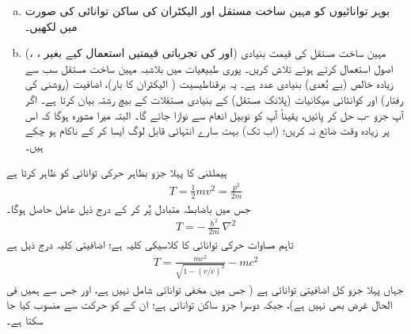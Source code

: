 \begin{enumerate}[a.]
\item
بوہر توانائیوں کو مہین ساخت مستقل اور الیکٹران کی ساکن توانائی  کی صورت میں لکھیں۔
\item
(، ،  اور  کی تجرباتی قیمتیں استعمال کیے بغیر) مہین ساخت مستقل کی قیمت بنیادی اصول استعمال کرتے ہوئے تلاش کریں۔ پوری طبیعیات میں بلاشبہ مہین ساخت مستقل سب سے زیادہ خالص (بے بُعدی) بنیادی عدد ہے۔ یہ برقناطیسیت ( الیکٹران کا بار)، اضافیت (روشنی کی رفتار) اور کوانٹائی میکانیات (پلانک مستقل) کے بنیادی مستقلات کے بیچ رشتہ بیان کرتا ہے۔ اگر آپ جزو -ب حل کر پائیں، یقیناً آپ کو نوبیل انعام سے نوازا جائے گا۔ البتہ میرا مشورہ ہوگا کہ اس پر زیادہ وقت ضائع نہ کریں؛ (اب تک) بہت سارے انتہائی قابل لوگ ایسا کر کے ناکام ہو چکے ہیں۔ 
\end{enumerate}

ہیملٹنی کا پہلا جزو بظاہر حرکی توانائی کو ظاہر کرتا ہے 
\begin{align}\label{مساوات_غیر_مضطرب_حرکی_توانائی}
T = \frac{1}{2} mv^2 = \frac{p^2}{2m} 
\end{align}
جس میں باضابطہ متبادل  پُر کر کے درج ذیل عامل حاصل ہوگا۔
\begin{align}
T = - \frac{\hslash^2}{2m} \nabla^2
\end{align} 
تاہم مساوات  حرکی توانائی کا کلاسیکی کلیہ ہے؛ اضافیتی کلیہ درج ذیل ہے
\begin{align}
T = \frac{mc^2}{\sqrt{1 - (v/c)^2}} - mc^2
\end{align}
جہاں پہلا جزو کل اضافیتی توانائی ہے ( جس میں مخفی توانائی شامل نہیں ہے، اور جس سے ہمیں فی الحال غرض بھی نہیں ہے)، جبکہ دوسرا جزو ساکن توانائی ہے؛ ان کے کو حرکت سے منسوب کیا جا سکتا ہے۔

